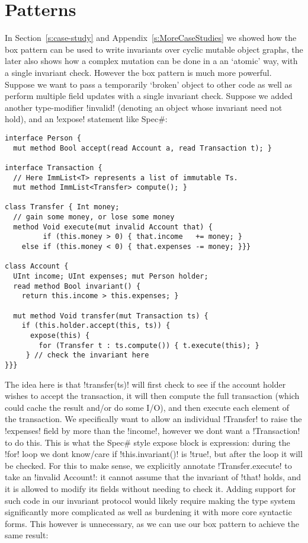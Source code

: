 \section{Patterns}
\label{s:patterns}
In Section~\ref{s:case-study} and Appendix~\ref{s:MoreCaseStudies} we showed how the box pattern can be used to write invariants over cyclic mutable object graphs, the later also shows how a complex mutation can be done in a an `atomic' way, with a single invariant check. However the box pattern is much more powerful. Suppose we want to pass a temporarily `broken' object to other code as well as perform multiple field updates with a single invariant check. Suppose we added another type-modifier \Q!invalid! (denoting an object whose invariant need not hold), and an \Q!expose! statement like Spec\#:
\begin{lstlisting}
interface Person {
  mut method Bool accept(read Account a, read Transaction t); }

interface Transaction { 
  // Here ImmList<T> represents a list of immutable Ts.
  mut method ImmList<Transfer> compute(); }

class Transfer { Int money;
  // gain some money, or lose some money
  method Void execute(mut invalid Account that) {
         if (this.money > 0) { that.income   += money; }
    else if (this.money < 0) { that.expenses -= money; }}}

class Account {
  UInt income; UInt expenses; mut Person holder;
  read method Bool invariant() {
    return this.income > this.expenses; }
    
  mut method Void transfer(mut Transaction ts) {
    if (this.holder.accept(this, ts)) {
      expose(this) {
        for (Transfer t : ts.compute()) { t.execute(this); }
     } // check the invariant here
}}}
\end{lstlisting}
The idea here is that \Q!transfer(ts)! will first check to see if the account holder wishes to accept the transaction, it will then compute the full transaction (which could cache the result and/or do some I/O), and then execute each element of the transaction. We specifically want to allow an individual \Q!Transfer! to raise the \Q!expenses! field by more than the \Q!income!, however we dont want a \Q!Transaction! to do this. This is what the Spec\# style expose block is expression: during the \Q!for! loop we dont know/care if \Q!this.invariant()! is \Q!true!, but after the loop it will be checked. For this to make sense, we explicitly annotate \Q!Transfer.execute! to take an \Q!invalid Account!: it cannot assume that the invariant of \Q!that! holds, and it is allowed to modify its fields without needing to check it. Adding support for such code in our invariant protocol would likely require making the type system significantly more complicated as well as burdening it with more core syntactic forms. This however is unnecessary, as we can use our box pattern to achieve the same result:
